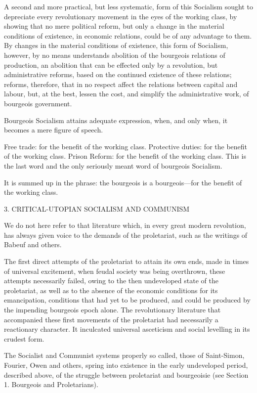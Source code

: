 A second and more practical, but less systematic, form of this
Socialism sought to depreciate every revolutionary movement in the eyes
of the working class, by showing that no mere political reform, but
only a change in the material conditions of existence, in economic
relations, could be of any advantage to them. By changes in the
material conditions of existence, this form of Socialism, however, by
no means understands abolition of the bourgeois relations of
production, an abolition that can be effected only by a revolution, but
administrative reforms, based on the continued existence of these
relations; reforms, therefore, that in no respect affect the relations
between capital and labour, but, at the best, lessen the cost, and
simplify the administrative work, of bourgeois government.

Bourgeois Socialism attains adequate expression, when, and only when,
it becomes a mere figure of speech.

Free trade: for the benefit of the working class. Protective duties:
for the benefit of the working class. Prison Reform: for the benefit of
the working class. This is the last word and the only seriously meant
word of bourgeois Socialism.

It is summed up in the phrase: the bourgeois is a bourgeois—for the
benefit of the working class.

3. CRITICAL-UTOPIAN SOCIALISM AND COMMUNISM

We do not here refer to that literature which, in every great modern
revolution, has always given voice to the demands of the proletariat,
such as the writings of Babeuf and others.

The first direct attempts of the proletariat to attain its own ends,
made in times of universal excitement, when feudal society was being
overthrown, these attempts necessarily failed, owing to the then
undeveloped state of the proletariat, as well as to the absence of the
economic conditions for its emancipation, conditions that had yet to be
produced, and could be produced by the impending bourgeois epoch alone.
The revolutionary literature that accompanied these first movements of
the proletariat had necessarily a reactionary character. It inculcated
universal asceticism and social levelling in its crudest form.

The Socialist and Communist systems properly so called, those of
Saint-Simon, Fourier, Owen and others, spring into existence in the
early undeveloped period, described above, of the struggle between
proletariat and bourgeoisie (see Section 1. Bourgeois and
Proletarians).

